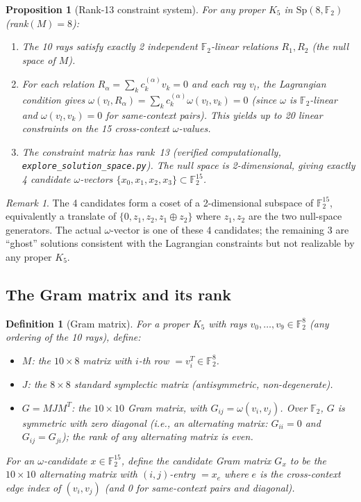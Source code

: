 \documentclass[11pt,a4paper]{article}
\newtheorem{proposition}[theorem]{Proposition}
\newtheorem{definition}[theorem]{Definition}
\theoremstyle{remark}
\newtheorem{remark}[theorem]{Remark}
\newcommand{\Sp}{\mathrm{Sp}}
\begin{document}
\begin{proposition}[Rank-13 constraint system]\label{prop:constraint}
For any proper $K_5$ in $\Sp(8,\mathbb{F}_2)$ (rank$(M)=8$):
\begin{enumerate}
  \item The 10 rays satisfy exactly 2 independent $\mathbb{F}_2$-linear
        relations $R_1, R_2$ (the null space of $M$).
  \item For each relation $R_\alpha = \sum_{k} c_k^{(\alpha)} v_k = 0$
        and each ray $v_l$, the Lagrangian condition gives
        $\omega(v_l, R_\alpha) = \sum_k c_k^{(\alpha)} \omega(v_l, v_k) = 0$
        (since $\omega$ is $\mathbb{F}_2$-linear and
        $\omega(v_l, v_k) = 0$ for same-context pairs).
        This yields up to 20 linear constraints on the 15 cross-context
        $\omega$-values.
  \item The constraint matrix has rank~13 (verified computationally,
        \texttt{explore\_solution\_space.py}).
        The null space is 2-dimensional, giving exactly 4 candidate
        $\omega$-vectors $\{x_0, x_1, x_2, x_3\} \subset \mathbb{F}_2^{15}$.
\end{enumerate}
\end{proposition}

\begin{remark}
The 4 candidates form a coset of a 2-dimensional subspace of $\mathbb{F}_2^{15}$,
equivalently a translate of $\{0, z_1, z_2, z_1 \oplus z_2\}$ where $z_1, z_2$
are the two null-space generators.
The actual $\omega$-vector is one of these 4 candidates; the remaining 3 are
``ghost'' solutions consistent with the Lagrangian constraints but not
realizable by any proper $K_5$.
\end{remark}

\subsection{The Gram matrix and its rank}

\begin{definition}[Gram matrix]
For a proper $K_5$ with rays $v_0, \ldots, v_9 \in \mathbb{F}_2^8$
(any ordering of the 10 rays), define:
\begin{itemize}
  \item $M$: the $10 \times 8$ matrix with $i$-th row $= v_i^T \in \mathbb{F}_2^8$.
  \item $J$: the $8 \times 8$ standard symplectic matrix (antisymmetric, non-degenerate).
  \item $G = MJM^T$: the $10 \times 10$ Gram matrix, with $G_{ij} = \omega(v_i, v_j)$.
        Over $\mathbb{F}_2$, $G$ is symmetric with zero diagonal (i.e., an
        \emph{alternating matrix}: $G_{ii} = 0$ and $G_{ij} = G_{ji}$);
        the rank of any alternating matrix is even.
\end{itemize}
For an $\omega$-candidate $x \in \mathbb{F}_2^{15}$,
define the \emph{candidate Gram matrix} $G_x$ to be the $10 \times 10$
alternating matrix with $(i,j)$-entry $= x_e$ where $e$ is the cross-context
edge index of $(v_i, v_j)$ (and 0 for same-context pairs and diagonal).
\end{definition}
\end{document}
